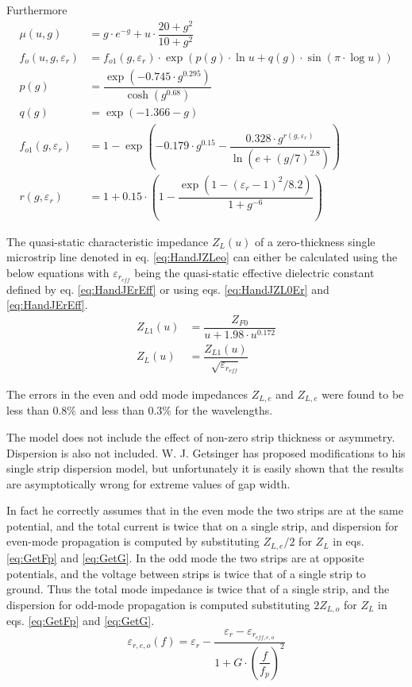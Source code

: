 \documentclass[10pt]{report}
\begin{document}
Furthermore
\begin{align}
\mu\left(u,g\right) &= g\cdot e^{-g}+ u\cdot \dfrac{20+g^2}{10+g^2}\\
f_o\left(u,g,\varepsilon_r\right) &= f_{o1}\left(g,\varepsilon_r\right)\cdot \exp{\left(p(g)\cdot \ln{u} + q(g)\cdot \sin{\left(\pi\cdot\log{u}\right)}\right)}\\
p(g) &= \dfrac{\exp{\left(-0.745\cdot g^{0.295}\right)}}{\cosh{\left(g^{0.68}\right)}}\\
q(g) &= \exp{\left(-1.366-g\right)}\\
f_{o1}\left(g,\varepsilon_r\right) &= 1 - \exp{\left(-0.179\cdot g^{0.15} - \dfrac{0.328\cdot g^{r\left(g,\varepsilon_r\right)}}{\ln{\left(e + \left(g/7\right)^{2.8}\right)}}\right)}\\
r\left(g,\varepsilon_r\right) &= 1+0.15\cdot\left(1 - \dfrac{\exp{\left(1-\left(\varepsilon_r - 1\right)^2/8.2\right)}}{1+g^{-6}}\right)
\end{align}

The quasi-static characteristic impedance $Z_L(u)$ of a zero-thickness
single microstrip line denoted in eq. \eqref{eq:HandJZLeo} can either
be calculated using the below equations with $\varepsilon_{r_{eff}}$
being the quasi-static effective dielectric constant defined by
eq. \eqref{eq:HandJErEff} or using eqs. \eqref{eq:HandJZL0Er} and
\eqref{eq:HandJErEff}.
\begin{align}
Z_{L1}(u) &= \dfrac{Z_{F0}}{u + 1.98\cdot u^{0.172}}\\
Z_{L}(u) &= \dfrac{Z_{L1}(u)}{\sqrt{\varepsilon_{r_{eff}}}}
\end{align}

The errors in the even and odd mode impedances $Z_{L,e}$ and $Z_{L,e}$
were found to be less than 0.8\% and less than 0.3\% for the
wavelengths.

\addvspace{12pt}

The model does not include the effect of non-zero strip thickness or
asymmetry.  Dispersion is also not included.  W. J. Getsinger
\cite{Getsinger4} has proposed modifications to his single strip
dispersion model, but unfortunately it is easily shown that the
results are asymptotically wrong for extreme values of gap width.

\addvspace{12pt}

In fact he correctly assumes that in the even mode the two strips are
at the same potential, and the total current is twice that on a single
strip, and dispersion for even-mode propagation is computed by
substituting $Z_{L,e}/2$ for $Z_L$ in eqs. \eqref{eq:GetFp} and
\eqref{eq:GetG}.  In the odd mode the two strips are at opposite
potentials, and the voltage between strips is twice that of a single
strip to ground.  Thus the total mode impedance is twice that of a
single strip, and the dispersion for odd-mode propagation is computed
substituting $2Z_{L,o}$ for $Z_L$ in eqs. \eqref{eq:GetFp} and
\eqref{eq:GetG}.
\begin{equation}
\varepsilon_{r,e,o}\left(f\right) = \varepsilon_{r} - \frac{\varepsilon_{r} - \varepsilon_{r_{eff,e,o}}}{1 + G\cdot \left(\dfrac{f}{f_{p}}\right)^{2}}
\end{equation}
\end{document}
